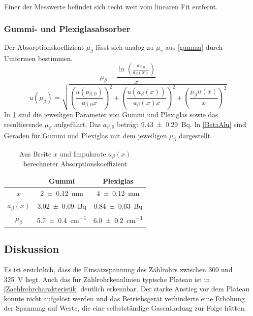 \documentclass[
	a4paper,
	12pt,
	pagesize,
	ngerman
]{scrartcl}
\begin{document}
	Einer der Messwerte befindet sich recht weit vom linearen Fit entfernt.
	
	\subsubsection*{Gummi- und Plexiglasabsorber} 
	Der Absorptionskoeffizient $\mu_\beta$ lässt sich analog zu $\mu_\gamma$ aus \cref{gamma} durch Umformen bestimmen.
	\begin{equation}
		\mu_\beta = \frac{\ln \left( \frac{a_{\beta,0}}{a_\beta(x)}\right)}{x}
	\end{equation}
	\begin{equation}
	u(\mu_\beta) = \sqrt{ \left(\frac{u(a_{\beta,0})}{a_{\beta,0}x}\right)^2 + \left(\frac{u(a_\beta(x))}{a_\beta(x)x}\right)^2 + \left(\frac{\mu_\beta u(x)}{x}\right)^2}
	\end{equation}
	In \cref{TabelleMu} sind die jeweiligen Parameter von Gummi und Plexiglas sowie das resultierende $\mu_\beta$ aufgeführt.
	Das $a_{\beta,0}$ beträgt \SI{9,43 +- 0,29}{Bq}.
	In \cref{BetaAlu} sind Geraden für Gummi und Plexiglas mit dem jeweiligen $\mu_\beta$ dargestellt.
	\begin{table}[H]
		\centering
		\begin{tabular}{ c | c | c }
			&Gummi & Plexiglas \\ \hline
			$x$&\SI{2+-0,12}{mm}&\SI{4+-0,12}{mm}\\
			$a_\beta(x)$&\SI{3,02+-0,09}{Bq}&\SI{0,84+-0,03}{Bq}\\
			$\mu_\beta$&\SI{5,7+-0,4}{cm^{-1}}&\SI{6,0+-0,2}{cm^{-1}}\\
			
		\end{tabular}
		\caption{Aus Breite $x$ und Impulsrate $a_\beta(x)$ berechneter Absorptionskoeffizient}
		\label{TabelleMu} 
	\end{table}
	
	\subsection{Diskussion}
	Es ist ersichtlich, dass die Einsatzspannung des Zählrohrs zwischen 300 und \SI{325}{V} liegt. %
	Auch das für Zählrohrkennlinien typische Plateau ist in \cref{Zaehlrohrcharakteristik} deutlich erkennbar.
	Der starke Anstieg vor dem Plateau konnte nicht aufgelöst werden und das Betriebsgerät verhinderte eine Erhöhung der Spannung auf Werte, die eine selbstständige Gasentladung zur Folge hätten.
	
\end{document}
